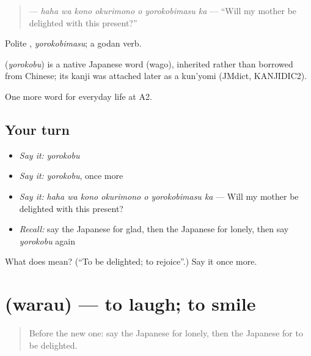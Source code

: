\begin{quote}
\textbf{   } — \emph{haha wa kono okurimono o yorokobimasu ka} — \textquotedblleft{}Will my mother be delighted with this present?\textquotedblright{}
\end{quote}

Polite \textbf{}, \emph{yorokobimasu}; a godan verb.

\begin{cousinweb}
\textbf{} (\emph{yorokobu}) is a native Japanese word (wago), inherited rather than borrowed from Chinese; its kanji was attached later as a kun'yomi (JMdict, KANJIDIC2).
\end{cousinweb}

\begin{grammarlens}[title={What you've built}]
One more word for everyday life at A2.
\end{grammarlens}

\subsection*{Your turn}
\begin{itemize}
\raggedright
  \item \emph{Say it:} \emph{yorokobu}
  \item \emph{Say it:} \emph{yorokobu}, once more
  \item \emph{Say it:} \emph{haha wa kono okurimono o yorokobimasu ka} — Will my mother be delighted with this present?
  \item \emph{Recall:} say the Japanese for glad, then the Japanese for lonely, then say \emph{yorokobu} again
\end{itemize}

\begin{tcolorbox}[breakable,colback=teal!4,colframe=teal!35!black,title={Before you move on}]
What does  mean? (\textquotedblleft{}To be delighted; to rejoice\textquotedblright{}.) Say it once more.
\end{tcolorbox}
\section[\texorpdfstring{\ja{わらう} (warau)}{わらう (warau)}]{ (warau) — to laugh; to smile}

\label{lesson:JA-C245-warau}



\begin{quote}
Before the new one: say the Japanese for lonely, then the Japanese for to be delighted.
\end{quote}

